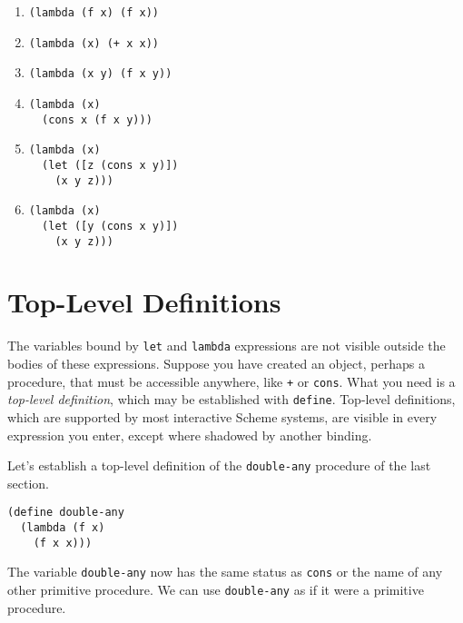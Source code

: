  
 \begin{enumerate}[\it a. ]
\item \texttt{(lambda (f x) (f x))}
\item \texttt{(lambda (x) (+ x x))}
\item \texttt{(lambda (x y) (f x y))}
\item 
\begin{alltt}
(lambda (x)
  (cons x (f x y)))
\end{alltt}

\item 
\begin{alltt}
(lambda (x)
  (let ([z (cons x y)])
    (x y z)))
\end{alltt}

\item 
\begin{alltt}
(lambda (x)
  (let ([y (cons x y)])
    (x y z)))
\end{alltt}

\end{enumerate}




\section{\label{start_g25}\label{start_h6}Top-Level Definitions\label{start_SECTGSTOPLEVEL}}



\label{start_s76}The \label{start_s77}variables bound by \texttt{let} and \texttt{lambda}
expressions are not visible outside the bodies of these expressions.
Suppose you have created an object, perhaps a procedure, that must
be accessible anywhere, like \texttt{+} or \texttt{cons}.
What you need is a \textit{top-level definition}, which may be established
with \label{start_s78}\texttt{define}.
Top-level definitions, which are supported by most interactive Scheme
systems, are visible in every expression you enter,
except where shadowed by another binding.


Let's establish a top-level definition of the \label{start_s79}\texttt{double-any}
procedure of the last section.


\begin{alltt}
(define double-any
  (lambda (f x)
    (f x x)))
\end{alltt}


The variable \texttt{double-any} now has the same status as \texttt{cons}
or the name of any other primitive procedure.
We can use \texttt{double-any} as if it were a primitive procedure.


